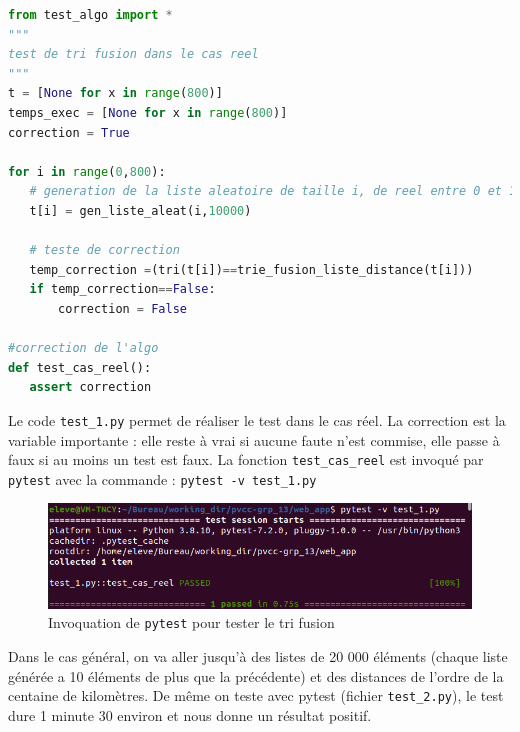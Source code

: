 \documentclass[11pt]{article}
\begin{document}
\begin{lstlisting}[language=Python, caption={ Fichier de test : \texttt{test\_1.py} }]
from test_algo import *
"""
test de tri fusion dans le cas reel
"""
t = [None for x in range(800)]
temps_exec = [None for x in range(800)]
correction = True
 
for i in range(0,800):
   # generation de la liste aleatoire de taille i, de reel entre 0 et 10k
   t[i] = gen_liste_aleat(i,10000)
 
   # teste de correction
   temp_correction =(tri(t[i])==trie_fusion_liste_distance(t[i]))
   if temp_correction==False:
       correction = False
 
#correction de l'algo
def test_cas_reel():
   assert correction
\end{lstlisting}

   
Le code \texttt{test\_1.py} permet de réaliser le test dans le cas réel. La correction est la variable importante : elle reste à vrai si aucune faute n’est commise, elle passe à faux si au moins un test est faux. La fonction \texttt{test\_cas\_reel} est invoqué par \texttt{pytest} avec la commande : \texttt{pytest -v test\_1.py}

\newpage %

\begin{figure}[h]
     \centering
     \includegraphics[scale=0.7]{pytest_test_1.png}
     \caption{Invoquation de \texttt{pytest} pour tester le tri fusion}
 \end{figure}


Dans le cas général, on va aller jusqu'à des listes de 20 000 éléments (chaque liste générée a 10 éléments de plus que la précédente) et des distances de l'ordre de la centaine de kilomètres.
De même on teste avec pytest (fichier \texttt{test\_2.py}), le test dure 1 minute 30 environ et nous donne un résultat positif.
\end{document}
